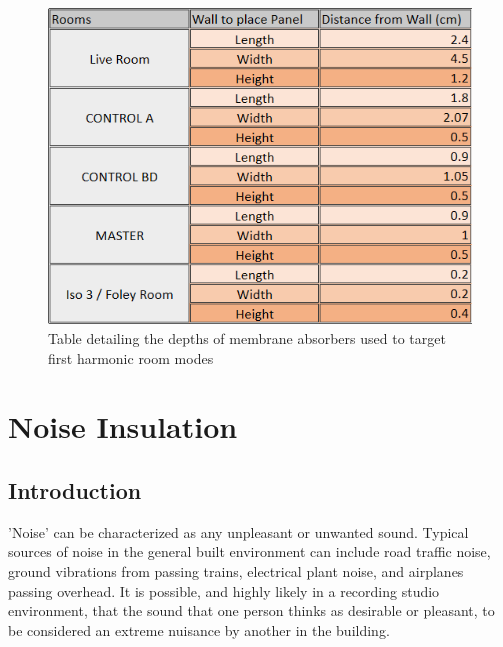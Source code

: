 \documentclass[10pt, twocolumn]{article}
\begin{document}
        \begin{figure}[H]
            \centering
            \includegraphics[scale=0.7]{resources/membrane.png}
            \caption{Table detailing the depths of membrane absorbers used to target first harmonic room modes}
            \label{membranetable}
        \end{figure}

        \newpage

    \section{Noise Insulation}
        \subsection{Introduction}
            'Noise' can be characterized as any unpleasant or unwanted sound.
            Typical sources of noise in the general built environment can include road traffic noise, ground vibrations from passing trains, electrical plant noise, and airplanes passing overhead.
            It is possible, and highly likely in a recording studio environment, that the sound that one person thinks as desirable or pleasant, to be considered an extreme nuisance by another in the building.
            
\end{document}
